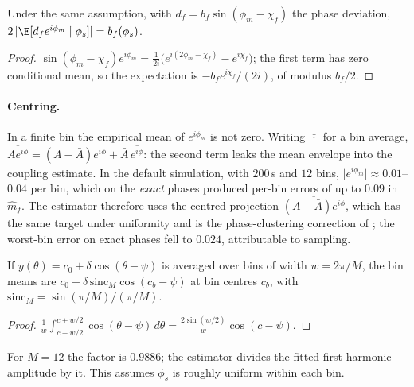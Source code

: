 \begin{proposition}
Under the same assumption, with
$d_f=b_f\sin(\phi_m-\chi_f)$ the phase deviation,
$2\,\lvert\E[d_fe^{i\phi_m}\mid\phi_s]\rvert=b_f(\phi_s)$.
\end{proposition}
\begin{proof}
$\sin(\phi_m-\chi_f)e^{i\phi_m}
=\tfrac1{2i}\bigl(e^{i(2\phi_m-\chi_f)}-e^{i\chi_f}\bigr)$; the first
term has zero conditional mean, so the expectation is
$-b_fe^{i\chi_f}/(2i)$, of modulus $b_f/2$.
\end{proof}

\paragraph{Centring.} In a finite bin the empirical mean of $e^{i\phi_m}$
is not zero. Writing $\bar{\,\cdot\,}$ for a bin average,
$\overline{Ae^{i\phi}}=\overline{(A-\bar A)e^{i\phi}}
+\bar A\,\overline{e^{i\phi}}$: the second term leaks the mean envelope
into the coupling estimate. In the default simulation, with $200$\,s and
$12$ bins, $\lvert\overline{e^{i\phi_m}}\rvert\approx0.01$--$0.04$ per bin,
which on the \emph{exact} phases produced per-bin errors of up to $0.09$
in $\hat m_f$. The estimator therefore uses the centred projection
$\overline{(A-\bar A)e^{i\phi}}$, which has the same target under
uniformity and is the phase-clustering correction of
\cite{vandriel2015}; the worst-bin error on exact phases fell to
$0.024$, attributable to sampling.

\begin{lemma}
If $y(\theta)=c_0+\delta\cos(\theta-\psi)$ is averaged over bins of width
$w=2\pi/M$, the bin means are $c_0+\delta\,\mathrm{sinc}_M\cos(c_b-\psi)$
at bin centres $c_b$, with $\mathrm{sinc}_M=\sin(\pi/M)/(\pi/M)$.
\end{lemma}
\begin{proof}
$\frac1w\int_{c-w/2}^{c+w/2}\cos(\theta-\psi)\,d\theta
=\frac{2\sin(w/2)}{w}\cos(c-\psi)$.
\end{proof}
For $M=12$ the factor is $0.9886$; the estimator divides the fitted
first-harmonic amplitude by it. This assumes $\phi_s$ is roughly uniform
within each bin.

